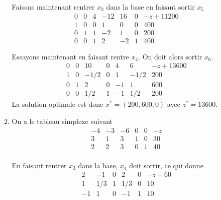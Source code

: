 \begin{enumerate}
\begin{solution}
\begin{enumerate}
          Faisons maintenant rentrer $x_2$ dans la base en faisant sortir $x_5$
          \[
            \begin{array}{cccccc|l}
              0 & 0 & 4 & -12 & 16 & 0 & -z+11200\\
              \hline
              1 & 0 & 0 &   1 &  0 & 0 & 400\\
              0 & 1 & 1 &  -2 &  1 & 0 & 200\\
              0 & 0 & 1 &   2 & -2 & 1 & 400
            \end{array}
          \]

          Essayons maintenant en faisant rentre $x_4$.
          On doit alors sortir $x_6$.
          \[
            \begin{array}{cccccc|l}
              0 & 0 &  10  & 0 &  4 &  6   & -z+13600\\
              \hline
              1 & 0 & -1/2 & 0 &  1 & -1/2 & 200\\
              0 & 1 &  2   & 0 & -1 &  1   & 600\\
              0 & 0 &  1/2 & 1 & -1 &  1/2 & 200
            \end{array}
          \]
          La solution optimale est donc $x^* = (200,600,0)$ avec $z^* = 13600$.
        \item
          On a le tableau simplexe suivant
          \[
            \begin{array}{ccccc|l}
              -4 & -3 & -6 & 0 & 0 & -z\\
              \hline
               3 &  1 &  3 & 1 & 0 & 30\\
               2 &  2 &  3 & 0 & 1 & 40\\
            \end{array}
          \]

          En faisant rentrer $x_3$ dans la base,
          $x_4$ doit sortir, ce qui donne
          \[
            \begin{array}{ccccc|l}
               2 & -1   & 0 & 2   & 0 & -z+60\\
              \hline
               1 &  1/3 & 1 & 1/3 & 0 & 10\\
              -1 &  1   & 0 & -1  & 1 & 10\\
            \end{array}
          \]


\end{enumerate}
\end{solution}
\end{enumerate}
